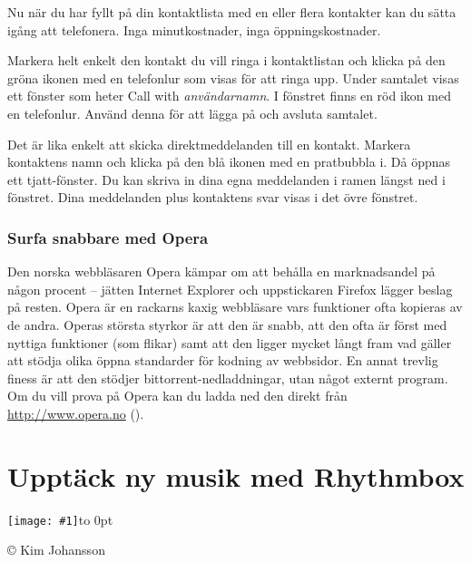 \documentclass[a4paper,final]{memoir} %
\newcommand{\xrcredit}[1]{\hbox to 0pt{\hspace*{.6\baselineskip}\begin{rotate}{90}{\usefont{T1}{phv}{m}{n}\selectfont\tiny #1}\end{rotate}}}
\newcommand\xintropic[1]{{\texttt{[image: \#1]}\xrcredit{\copyright{} Kim Johansson}}\medskip}
\newcommand\xchapter[2]{\chapter{#2}\begin{center}\xintropic{#1}\end{center}}
\begin{document}
Nu när du har fyllt på din kontaktlista med en eller flera kontakter kan du sätta igång att telefonera. Inga minutkostnader, inga öppningskostnader. 

Markera helt enkelt den kontakt du vill ringa i kontaktlistan och klicka på den gröna ikonen med en telefonlur som visas för att ringa upp. Under samtalet visas ett fönster som heter Call with \textit{användarnamn}. I fönstret finns en röd ikon med en telefonlur. Använd denna för att lägga på och avsluta samtalet.

Det är lika enkelt att skicka direktmeddelanden till en kontakt. Markera kontaktens namn och klicka på den blå ikonen med en pratbubbla i. Då öppnas ett tjatt-fönster. Du kan skriva in dina egna meddelanden i ramen längst ned i fönstret. Dina meddelanden plus kontaktens svar visas i det övre fönstret.




\subsection{Surfa snabbare med Opera}


Den norska webbläsaren Opera kämpar om att behålla en marknadsandel på någon procent -- jätten Internet Explorer och uppstickaren Firefox lägger beslag på resten. Opera är en rackarns kaxig webbläsare vars funktioner ofta kopieras av de andra. Operas största styrkor är att den är snabb, att den ofta är först med nyttiga funktioner (som flikar) samt att den ligger mycket långt fram vad gäller att stödja olika öppna standarder för kodning av webbsidor. En annat trevlig finess är att den stödjer bittorrent-nedladdningar, utan något externt program. Om du vill prova på Opera kan du ladda ned den direkt från \url{http://www.opera.no} ().




\xchapter{bilder804-all/Upptack_ny_musik}{Upptäck ny musik med Rhythmbox}
\end{document}
